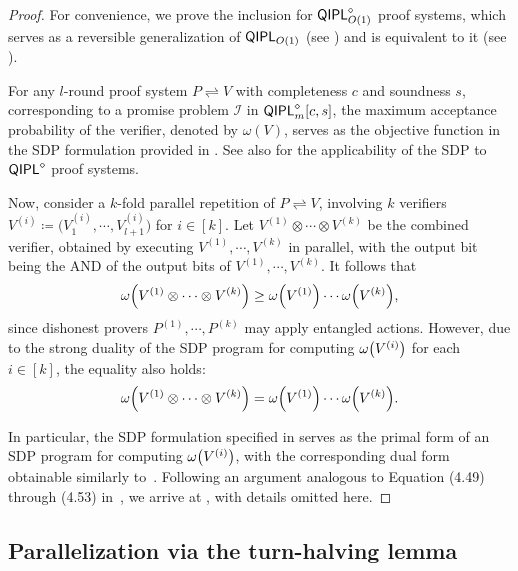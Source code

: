 \documentclass[11pt, a4paper]{article}
\numberwithin{equation}{section}
\numberwithin{figure}{section}
\newcommand{\QIPL}{\textnormal{\textsf{QIPL}}\xspace}
\newcommand{\protocol}[2]{{#1}\!\rightleftharpoons\!{#2}}
\DeclarePairedDelimiter\rbra{\lparen}{\rparen}
\newcommand{\calI}{\mathcal{I}}
\begin{document}
\begin{proof} 
    For convenience, we prove the inclusion for $\QIPL^{\diamond}_{O(1)}$ proof systems, which serves as a reversible generalization of $\QIPL_{O(1)}$  (see ) and is equivalent to it (see ). 
        
    For any $l$-round proof system $\protocol{P}{V}$ with completeness $c$ and soundness $s$, corresponding to a promise problem $\calI$ in $\QIPL^{\diamond}_m[c,s]$, the maximum acceptance probability of the verifier, denoted by $\omega(V)$, serves as the objective function in the SDP formulation provided in . See also  for the applicability of the SDP to $\QIPL^{\diamond}$ proof systems. 
    
    Now, consider a $k$-fold parallel repetition of $\protocol{P}{V}$, involving $k$ verifiers $V^{(i)} \coloneqq \big( V_1^{(i)}, \cdots, V_{l+1}^{(i)} \big)$ for $i \in [k]$. Let $V^{(1)} \!\otimes\! \cdots \!\otimes\! V^{(k)}$ be the combined verifier, obtained by executing $V^{(1)}, \cdots, V^{(k)}$ in parallel, with the output bit being the AND of the output bits of $V^{(1)},\cdots,V^{(k)}$. It follows that
    \[ \omega\rbra*{V^{(1)} \otimes \cdots \otimes V^{(k)}} \geq \omega\rbra*{V^{(1)}}  \cdots \omega\rbra*{V^{(k)}},\]
    since dishonest provers $P^{(1)}, \cdots, P^{(k)}$ may apply entangled actions. However, due to the strong duality of the SDP program for computing $\omega\rbra*{V^{(i)}}$ for each $i\in[k]$, the equality also holds: 
    \begin{equation}
        \label{eq:QIPL-parallel-repetation-pacc}
        \omega\rbra*{V^{(1)} \otimes \cdots \otimes V^{(k)}} = \omega\rbra*{V^{(1)}}  \cdots \omega\rbra*{V^{(k)}}.
    \end{equation}

    In particular, the SDP formulation specified in  serves as the primal form of an SDP program for computing $\omega\rbra*{V^{(i)}}$, with the corresponding dual form obtainable similarly to~\cite[Figure 4.7]{VW16}. Following an argument analogous to Equation (4.49) through (4.53) in~\cite[Section 4.3]{VW16}, we arrive at , with details omitted here. 
\end{proof}

\subsection{Parallelization via the turn-halving lemma}
\label{subsec:parallelization}
\end{document}

